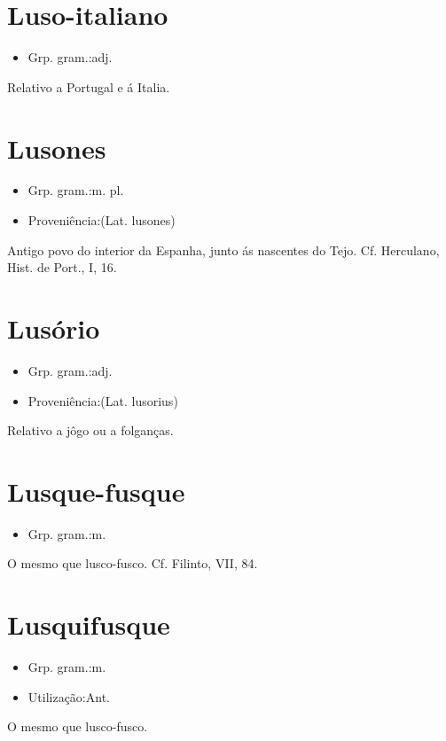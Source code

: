 \section{Luso-italiano}
\begin{itemize}
\item {Grp. gram.:adj.}
\end{itemize}
Relativo a Portugal e á Italia.
\section{Lusones}
\begin{itemize}
\item {Grp. gram.:m. pl.}
\end{itemize}
\begin{itemize}
\item {Proveniência:(Lat. \textunderscore lusones\textunderscore )}
\end{itemize}
Antigo povo do interior da Espanha, junto ás nascentes do Tejo. Cf. Herculano, \textunderscore Hist. de Port.\textunderscore , I, 16.
\section{Lusório}
\begin{itemize}
\item {Grp. gram.:adj.}
\end{itemize}
\begin{itemize}
\item {Proveniência:(Lat. lusorius)}
\end{itemize}
Relativo a jôgo ou a folganças.
\section{Lusque-fusque}
\begin{itemize}
\item {Grp. gram.:m.}
\end{itemize}
O mesmo que \textunderscore lusco-fusco\textunderscore . Cf. Filinto, VII, 84.
\section{Lusquifusque}
\begin{itemize}
\item {Grp. gram.:m.}
\end{itemize}
\begin{itemize}
\item {Utilização:Ant.}
\end{itemize}
O mesmo que \textunderscore lusco-fusco\textunderscore .
